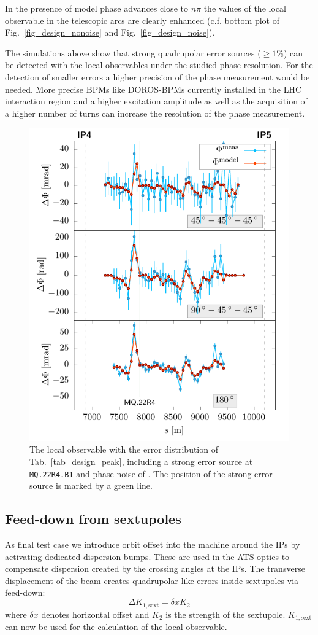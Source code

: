 In the presence of model phase advances close to $n\pi$ the values of the local observable in the
telescopic arcs are clearly enhanced (c.f. bottom plot of Fig.~\ref{fig_design_nonoise} and
Fig.~\ref{fig_design_noise}).

The simulations above show that strong quadrupolar error sources ($\geq 1\%$) can be detected with the local
observables under the studied phase resolution.
For the detection of smaller errors a higher precision of the phase measurement would be needed.
More precise BPMs like DOROS-BPMs \cite{Gasior2011} currently installed in the LHC interaction region and a higher excitation
amplitude as well as the acquisition of a higher number of turns
can increase the resolution of the phase measurement. 
%
\begin{figure}
  \centering
\includegraphics[width=.6\linewidth]{sim_peak}
\caption{The local observable with the error distribution of Tab.~\ref{tab_design_peak}, including
    a strong error source at \texttt{MQ.22R4.B1} and phase
    noise of \noiserms.
    The position of the strong error source is marked by a green line.
  }
  \label{fig_peak_noise}
\end{figure}
%
\subsection{Feed-down from sextupoles}

As final test case we introduce orbit offset into the machine around the IPs by activating dedicated dispersion
bumps. These are used in the ATS optics to compensate dispersion created by the crossing angles at the IPs.
The transverse displacement of the beam creates quadrupolar-like errors inside sextupoles via feed-down:
%
\begin{equation}
  \Delta K_{1,\text{sext}} = \delta x K_2
  \label{eq_sext_fedddown}
\end{equation}
%
where $\delta x$ denotes horizontal offset and $K_2$ is the strength of the sextupole. $K_{1,\text{sext}}$
can now be used for the calculation of the local observable.




